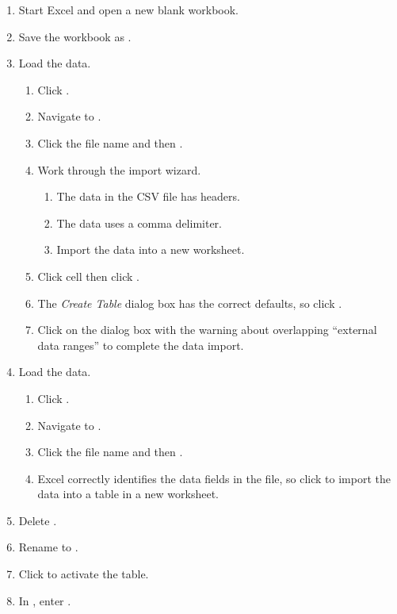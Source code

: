 \begin{enumerate}
	\item Start Excel and open a new blank workbook.
	\item Save the workbook as .

	\item {} Load the data.
	\begin{enumerate}		
		\item Click .
		\item Navigate to .
		\item Click the file name and then .
		\item Work through the import wizard.
		\begin{enumerate}
			\item The data in the CSV file has headers.
			\item The data uses a comma delimiter.
			\item Import the data into a new worksheet.
		\end{enumerate}
		\item Click cell  then click .
		\item The \textit{Create Table} dialog box has the correct defaults, so click .
		\item Click  on the dialog box with the warning about overlapping ``external data ranges'' to complete the data import.
	\end{enumerate}

	\item {} Load the data.
	\begin{enumerate}
		\item Click .
		\item Navigate to .
		\item Click the file name and then .
		\item Excel correctly identifies the data fields in the file, so click  to import the data into a table in a new worksheet.	
	\end{enumerate}		
		
	\item Delete .
	\item Rename  to .
	\item Click  to activate the table.
	\item In , enter .
\end{enumerate}

